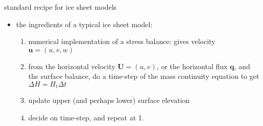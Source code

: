 \begin{frame}{standard recipe for ice sheet models}

\begin{itemize}
\item the ingredients of a typical ice sheet model:
  \begin{enumerate}
  \item numerical implementation of a stress balance: gives velocity $\mathbf{u}=(u,v,w)$
  \item from the horizontal velocity $\mathbf{U}=(u,v)$, or the horizontal flux $\mathbf{q}$, and the surface balance, do a time-step of the mass continuity equation to get $\Delta H = H_t \Delta t$
  \item update upper (and perhaps lower) surface elevation
  \item decide on time-step, and repeat at 1.
  \end{enumerate}
\end{itemize}
\end{frame}
